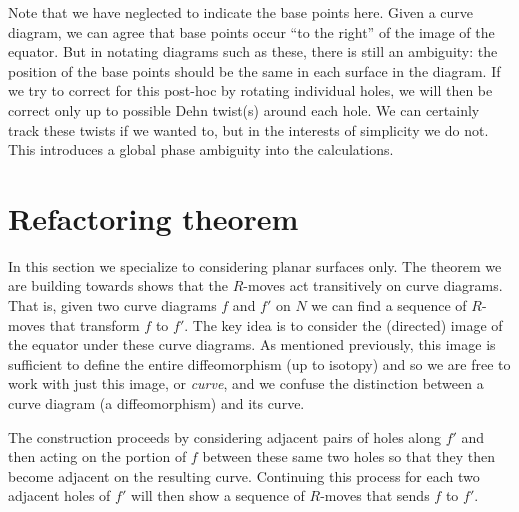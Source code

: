 \documentclass[aps, prl, letterpaper, twocolumn, superscriptaddress, notitlepage, 10pt]{revtex4-1}
\begin{document}
Note that we have neglected to indicate the base points here.
Given a curve diagram, we can agree that base points
occur ``to the right'' of the image of the equator.
But in notating diagrams such as these, there is still
an ambiguity: the position of the base points should be the
same in each surface in the diagram.
If we try to correct for this post-hoc
by rotating individual holes,
we will then be correct
only up to possible Dehn twist(s) around each hole.
We can certainly track these twists if we wanted to,
but in the interests of simplicity we do not.
This introduces a global phase ambiguity into the
calculations.

\section{Refactoring theorem}

In this section we specialize to considering planar 
surfaces only.
The theorem we are building towards shows that
the $R$-moves act transitively on curve diagrams.
That is, given two curve diagrams $f$ and $f'$ on $N$ we can find
a sequence of $R$-moves that transform $f$ to $f'.$
The key idea is to consider the (directed) image of the equator under
these curve diagrams.
As mentioned previously, this image is sufficient to
define the entire diffeomorphism (up to isotopy) and so we are free
to work with just this image, or \emph{curve},
and we confuse the distinction between 
a curve diagram (a diffeomorphism)
and its curve.

The construction proceeds by considering adjacent
pairs of holes along $f'$ and then acting on the
portion of $f$ between these same two holes so that
they then become adjacent on the resulting curve.
Continuing this
process for each two adjacent holes of $f'$ will then
show a sequence of $R$-moves that sends $f$ to $f'.$
\end{document}

